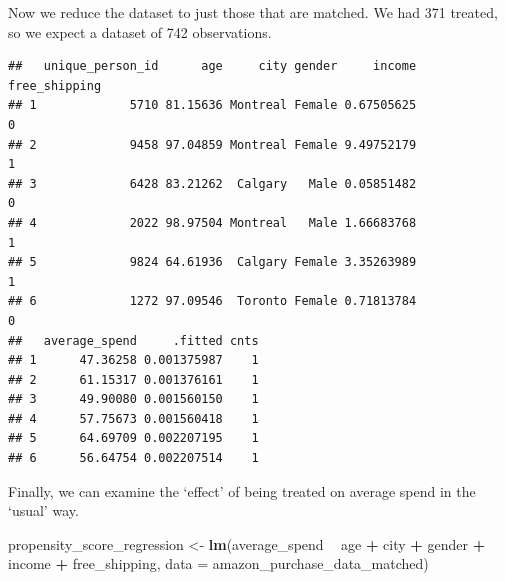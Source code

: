 \documentclass[
]{book}
\newenvironment{Shaded}{\begin{snugshade}}{\end{snugshade}}
\newcommand{\DataTypeTok}[1]{\textcolor[rgb]{0.13,0.29,0.53}{#1}}
\newcommand{\DecValTok}[1]{\textcolor[rgb]{0.00,0.00,0.81}{#1}}
\newcommand{\KeywordTok}[1]{\textcolor[rgb]{0.13,0.29,0.53}{\textbf{#1}}}
\newcommand{\NormalTok}[1]{#1}
\newcommand{\OperatorTok}[1]{\textcolor[rgb]{0.81,0.36,0.00}{\textbf{#1}}}
\newcommand{\StringTok}[1]{\textcolor[rgb]{0.31,0.60,0.02}{#1}}
\begin{document}
Now we reduce the dataset to just those that are matched. We had 371 treated, so we expect a dataset of 742 observations.

\begin{Shaded}
\end{Shaded}

\begin{verbatim}
##   unique_person_id      age     city gender     income free_shipping
## 1             5710 81.15636 Montreal Female 0.67505625             0
## 2             9458 97.04859 Montreal Female 9.49752179             1
## 3             6428 83.21262  Calgary   Male 0.05851482             0
## 4             2022 98.97504 Montreal   Male 1.66683768             1
## 5             9824 64.61936  Calgary Female 3.35263989             1
## 6             1272 97.09546  Toronto Female 0.71813784             0
##   average_spend     .fitted cnts
## 1      47.36258 0.001375987    1
## 2      61.15317 0.001376161    1
## 3      49.90080 0.001560150    1
## 4      57.75673 0.001560418    1
## 5      64.69709 0.002207195    1
## 6      56.64754 0.002207514    1
\end{verbatim}

Finally, we can examine the `effect' of being treated on average spend in the `usual' way.

\begin{Shaded}
\begin{Highlighting}[]
\NormalTok{propensity_score_regression <-}\StringTok{ }\KeywordTok{lm}\NormalTok{(average_spend }\OperatorTok{~}\StringTok{ }\NormalTok{age }\OperatorTok{+}\StringTok{ }\NormalTok{city }\OperatorTok{+}\StringTok{ }\NormalTok{gender }\OperatorTok{+}\StringTok{ }\NormalTok{income }\OperatorTok{+}\StringTok{ }\NormalTok{free_shipping, }
                                  \DataTypeTok{data =}\NormalTok{ amazon_purchase_data_matched)}
\end{Highlighting}
\end{Shaded}
\end{document}
